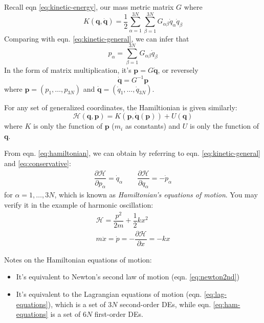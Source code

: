 \documentclass[
  10pt,
  twoside,
  openany,
  b5paper, %
  colorscheme = bootstrap-v4, %
]{qyxf-book}
\newcommand{\p}[2]{\dfrac{\partial #1}{\partial #2}}
\newcommand{\vr}{\boldsymbol{r}}
\newcommand{\vp}{\boldsymbol{p}}
\newcommand{\vq}{\boldsymbol{q}}
\newcommand{\dvq}{\dot{\vq}}
\newcommand{\half}{\dfrac{1}{2}}
\newcommand{\sumin}{\sum_{i=1}^N}
\newcommand{\suman}{\sum_{\alpha=1}^{3N}}
\newcommand{\ham}{\mathcal{H}} %
\begin{document}
Recall eqn \ref{eq:kinetic-energy}, our mass metric matrix $G$ where
\begin{equation}
	K(\vq,\dvq)=\half\suman\sum_{\beta=1}^{3N}G_{\alpha\beta}\dot{q}_\alpha\dot{q}_\beta
\end{equation}
Comparing with eqn. \ref{eq:kinetic-general}, we can infer that
\begin{equation}
	p_\alpha=\sum_{\beta=1}^{3N}G_{\alpha\beta}\dot{q}_\beta
\end{equation}
In the form of matrix multiplication, it's $\vp=G\dvq$, or reversely
\begin{equation}
	\dvq=G^{-1}\vp
\end{equation}
where $\vp=(p_1,\dots,p_{3N})$ and $\dvq=(\dot{q}_1,\dots,\dot{q}_{3N})$.

For any set of generalized coordinates, the Hamiltionian is given similarly:
\begin{equation}
	\ham(\vq,\vp)=K(\vp,\dvq(\vp))+U(\vq) \label{eq:hamiltonian}
\end{equation}
where $K$ is only the function of $\vp$ ($m_i$ as constants) and $U$ is only the function of $\vq$.

From eqn. \ref{eq:hamiltonian}, we can obtain by referring to eqn. \ref{eq:kinetic-general} and \ref{eq:conservative}:
\begin{gather}
	\p{\ham}{p_\alpha}=\dot{q}_\alpha \qquad \p{\ham}{q_\alpha}=-\dot{p}_\alpha
	\label{eq:ham-equations}
\end{gather}
for $\alpha=1,\dots,3N$, which is known as \textit{Hamiltonian's equations of motion}. You may verify it in the example of harmonic oscillation:
\begin{gather*}
	\ham=\dfrac{p^2}{2m}+\half kx^2\\
	m\ddot{x}=\dot{p}=-\p{\ham}{x}=-kx
\end{gather*}

Notes on the Hamiltonian equations of motion:
\begin{itemize}
	\item It's equivalent to Newton's second law of motion (eqn. \ref{eq:newton2nd})
	\item It's equivalent to the Lagrangian equations of motion (eqn. \ref{eq:lag-equations}), which is a set of $3N$ second-order DEs, while eqn. \ref{eq:ham-equations} is a set of $6N$ first-order DEs.
\end{itemize}
\end{document}
